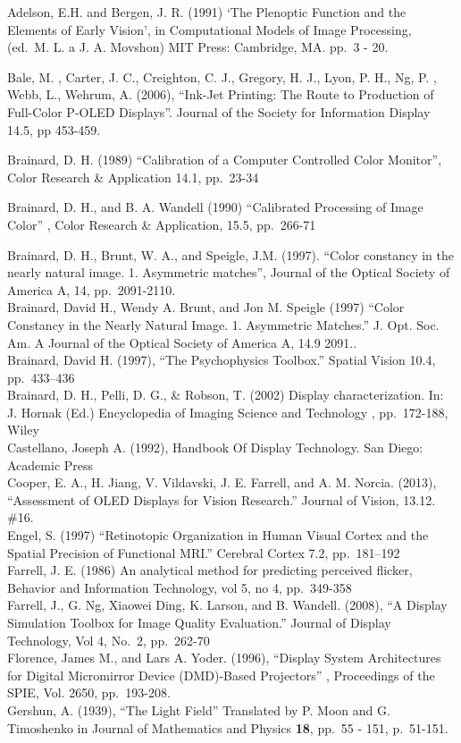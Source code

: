 \documentclass[
  letterpaper,
]{book}
\begin{document}
Adelson, E.H. and Bergen, J. R. (1991) `The Plenoptic Function and the
Elements of Early Vision', in Computational Models of Image Processing,
(ed.~M. L. a J. A. Movshon) MIT Press: Cambridge, MA. pp.~3 - 20.

Bale, M. , Carter, J. C., Creighton, C. J., Gregory, H. J., Lyon, P. H.,
Ng, P. , Webb, L., Wehrum, A. (2006), ``Ink-Jet Printing: The Route to
Production of Full-Color P-OLED Displays''. Journal of the Society for
Information Display 14.5, pp 453-459.

Brainard, D. H. (1989) ``Calibration of a Computer Controlled Color
Monitor'', Color Research \& Application 14.1, pp.~23-34

Brainard, D. H., and B. A. Wandell (1990) ``Calibrated Processing of
Image Color'' , Color Research \& Application, 15.5, pp.~266-71

Brainard, D. H., Brunt, W. A., and Speigle, J.M. (1997). ``Color
constancy in the nearly natural image. 1. Asymmetric matches'', Journal
of the Optical Society of America A, 14, pp.~2091-2110.\\
Brainard, David H., Wendy A. Brunt, and Jon M. Speigle (1997) ``Color
Constancy in the Nearly Natural Image. 1. Asymmetric Matches.'' J. Opt.
Soc. Am. A Journal of the Optical Society of America A, 14.9 2091..\\
Brainard, David H. (1997), ``The Psychophysics Toolbox.'' Spatial Vision
10.4, pp.~433--436\\
Brainard, D. H., Pelli, D. G., \& Robson, T. (2002) Display
characterization. In: J. Hornak (Ed.) Encyclopedia of Imaging Science
and Technology , pp.~172-188, Wiley\\
Castellano, Joseph A. (1992), Handbook Of Display Technology. San Diego:
Academic Press\\
Cooper, E. A., H. Jiang, V. Vildavski, J. E. Farrell, and A. M. Norcia.
(2013), ``Assessment of OLED Displays for Vision Research.'' Journal of
Vision, 13.12. \#16.\\
Engel, S. (1997) ``Retinotopic Organization in Human Visual Cortex and
the Spatial Precision of Functional MRI.'' Cerebral Cortex 7.2,
pp.~181--192\\
Farrell, J. E. (1986) An analytical method for predicting perceived
flicker, Behavior and Information Technology, vol 5, no 4, pp.~349-358\\
Farrell, J., G. Ng, Xiaowei Ding, K. Larson, and B. Wandell. (2008), ``A
Display Simulation Toolbox for Image Quality Evaluation.'' Journal of
Display Technology, Vol 4, No.~2, pp.~262-70\\
Florence, James M., and Lars A. Yoder. (1996), ``Display System
Architectures for Digital Micromirror Device (DMD)-Based Projectors'' ,
Proceedings of the SPIE, Vol. 2650, pp.~193-208.\\
Gershun, A. (1939), ``The Light Field'' Translated by P. Moon and G.
Timoshenko in Journal of Mathematics and Physics \textbf{18}, pp.~55 -
151, p.~51-151.
\end{document}
